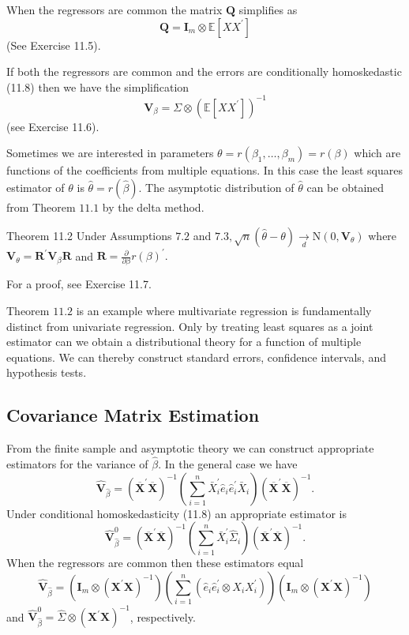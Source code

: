 \documentclass[10pt]{article}
\begin{document}
When the regressors are common the matrix $\boldsymbol{Q}$ simplifies as
$$
\boldsymbol{Q}=\boldsymbol{I}_{m} \otimes \mathbb{E}\left[X X^{\prime}\right]
$$
(See Exercise 11.5).

If both the regressors are common and the errors are conditionally homoskedastic (11.8) then we have the simplification
$$
\boldsymbol{V}_{\beta}=\Sigma \otimes\left(\mathbb{E}\left[X X^{\prime}\right]\right)^{-1}
$$
(see Exercise 11.6).

Sometimes we are interested in parameters $\theta=r\left(\beta_{1}, \ldots, \beta_{m}\right)=r(\beta)$ which are functions of the coefficients from multiple equations. In this case the least squares estimator of $\theta$ is $\widehat{\theta}=r(\widehat{\beta})$. The asymptotic distribution of $\widehat{\theta}$ can be obtained from Theorem $11.1$ by the delta method.

Theorem 11.2 Under Assumptions $7.2$ and $7.3, \sqrt{n}(\widehat{\theta}-\theta) \underset{d}{\longrightarrow} \mathrm{N}\left(0, \boldsymbol{V}_{\theta}\right)$ where $\boldsymbol{V}_{\theta}=\boldsymbol{R}^{\prime} \boldsymbol{V}_{\beta} \boldsymbol{R}$ and $\boldsymbol{R}=\frac{\partial}{\partial \beta} r(\beta)^{\prime} .$

For a proof, see Exercise 11.7.

Theorem $11.2$ is an example where multivariate regression is fundamentally distinct from univariate regression. Only by treating least squares as a joint estimator can we obtain a distributional theory for a function of multiple equations. We can thereby construct standard errors, confidence intervals, and hypothesis tests.

\subsection{Covariance Matrix Estimation}
From the finite sample and asymptotic theory we can construct appropriate estimators for the variance of $\widehat{\beta}$. In the general case we have
$$
\widehat{\boldsymbol{V}}_{\widehat{\beta}}=\left(\overline{\boldsymbol{X}}^{\prime} \overline{\boldsymbol{X}}\right)^{-1}\left(\sum_{i=1}^{n} \bar{X}_{i}^{\prime} \widehat{e}_{i} \widehat{e}_{i}^{\prime} \bar{X}_{i}\right)\left(\overline{\boldsymbol{X}}^{\prime} \overline{\boldsymbol{X}}\right)^{-1} .
$$
Under conditional homoskedasticity (11.8) an appropriate estimator is
$$
\widehat{\boldsymbol{V}}_{\widehat{\beta}}^{0}=\left(\overline{\boldsymbol{X}}^{\prime} \overline{\boldsymbol{X}}\right)^{-1}\left(\sum_{i=1}^{n} \bar{X}_{i}^{\prime} \widehat{\Sigma}_{i}\right)\left(\overline{\boldsymbol{X}}^{\prime} \overline{\boldsymbol{X}}\right)^{-1} .
$$
When the regressors are common then these estimators equal
$$
\widehat{\boldsymbol{V}}_{\widehat{\beta}}=\left(\boldsymbol{I}_{m} \otimes\left(\boldsymbol{X}^{\prime} \boldsymbol{X}\right)^{-1}\right)\left(\sum_{i=1}^{n}\left(\widehat{e}_{i} \widehat{e}_{i}^{\prime} \otimes X_{i} X_{i}^{\prime}\right)\right)\left(\boldsymbol{I}_{m} \otimes\left(\boldsymbol{X}^{\prime} \boldsymbol{X}\right)^{-1}\right)
$$
and $\widehat{\boldsymbol{V}}_{\widehat{\beta}}^{0}=\widehat{\Sigma} \otimes\left(\boldsymbol{X}^{\prime} \boldsymbol{X}\right)^{-1}$, respectively.
\end{document}
